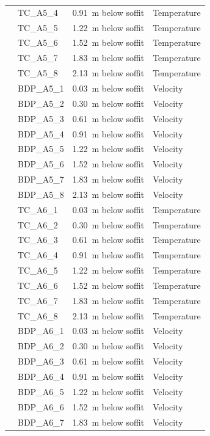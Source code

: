 \documentclass[12pt,oneside]{book}
\begin{document}
\begin{longtable}[c]{c|lll}
 & TC\_A5\_4  & 0.91~m below soffit  & Temperature \\
 & TC\_A5\_5  & 1.22~m below soffit  & Temperature \\
 & TC\_A5\_6  & 1.52~m below soffit  & Temperature \\
 & TC\_A5\_7  & 1.83~m below soffit  & Temperature \\
 & TC\_A5\_8  & 2.13~m below soffit  & Temperature \\
\cline{2-4}
 & BDP\_A5\_1 & 0.03~m below soffit  & Velocity \\
 & BDP\_A5\_2 & 0.30~m below soffit  & Velocity \\
 & BDP\_A5\_3 & 0.61~m below soffit  & Velocity \\
 & BDP\_A5\_4 & 0.91~m below soffit  & Velocity \\
 & BDP\_A5\_5 & 1.22~m below soffit  & Velocity \\
 & BDP\_A5\_6 & 1.52~m below soffit  & Velocity \\
 & BDP\_A5\_7 & 1.83~m below soffit  & Velocity \\
 & BDP\_A5\_8 & 2.13~m below soffit  & Velocity \\
\bottomrule
\newpage
\multirow{16}{*}{\large{\textbf{A6}}}
 & TC\_A6\_1  & 0.03~m below soffit  & Temperature \\
 & TC\_A6\_2  & 0.30~m below soffit  & Temperature \\
 & TC\_A6\_3  & 0.61~m below soffit  & Temperature \\
 & TC\_A6\_4  & 0.91~m below soffit  & Temperature \\
 & TC\_A6\_5  & 1.22~m below soffit  & Temperature \\
 & TC\_A6\_6  & 1.52~m below soffit  & Temperature \\
 & TC\_A6\_7  & 1.83~m below soffit  & Temperature \\
 & TC\_A6\_8  & 2.13~m below soffit  & Temperature \\
\cline{2-4}
 & BDP\_A6\_1 & 0.03~m below soffit  & Velocity \\
 & BDP\_A6\_2 & 0.30~m below soffit  & Velocity \\
 & BDP\_A6\_3 & 0.61~m below soffit  & Velocity \\
 & BDP\_A6\_4 & 0.91~m below soffit  & Velocity \\
 & BDP\_A6\_5 & 1.22~m below soffit  & Velocity \\
 & BDP\_A6\_6 & 1.52~m below soffit  & Velocity \\
 & BDP\_A6\_7 & 1.83~m below soffit  & Velocity \\

\end{longtable}
\end{document}
